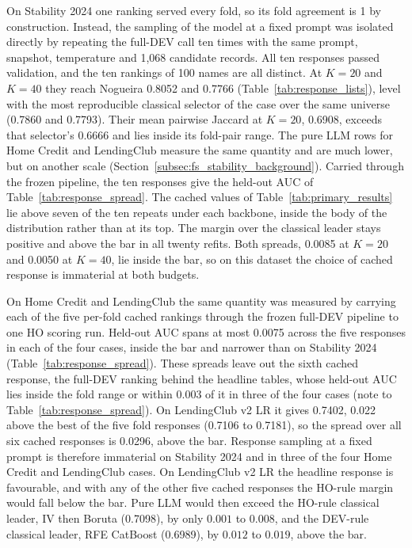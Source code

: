 \documentclass[final,5p,twocolumn]{elsarticle}
\newcommand{\Kfeat}{K}
\begin{document}
On Stability 2024 one ranking served every fold, so its fold agreement is 1 by construction. Instead, the sampling of the model at a fixed prompt was isolated directly by repeating the full-DEV call ten times with the same prompt, snapshot, temperature and 1,068 candidate records. All ten responses passed validation, and the ten rankings of 100 names are all distinct. At $\Kfeat=20$ and $\Kfeat=40$ they reach Nogueira 0.8052 and 0.7766 (Table~\ref{tab:response_lists}), level with the most reproducible classical selector of the case over the same universe (0.7860 and 0.7793). Their mean pairwise Jaccard at $\Kfeat=20$, 0.6908, exceeds that selector's 0.6666 and lies inside its fold-pair range. The pure LLM rows for Home Credit and LendingClub measure the same quantity and are much lower, but on another scale (Section~\ref{subsec:fs_stability_background}). Carried through the frozen pipeline, the ten responses give the held-out AUC of Table~\ref{tab:response_spread}. The cached values of Table~\ref{tab:primary_results} lie above seven of the ten repeats under each backbone, inside the body of the distribution rather than at its top. The margin over the classical leader stays positive and above the bar in all twenty refits. Both spreads, 0.0085 at $\Kfeat=20$ and 0.0050 at $\Kfeat=40$, lie inside the bar, so on this dataset the choice of cached response is immaterial at both budgets.

On Home Credit and LendingClub the same quantity was measured by carrying each of the five per-fold cached rankings through the frozen full-DEV pipeline to one HO scoring run. Held-out AUC spans at most 0.0075 across the five responses in each of the four cases, inside the bar and narrower than on Stability 2024 (Table~\ref{tab:response_spread}). These spreads leave out the sixth cached response, the full-DEV ranking behind the headline tables, whose held-out AUC lies inside the fold range or within 0.003 of it in three of the four cases (note to Table~\ref{tab:response_spread}). On LendingClub v2 LR it gives 0.7402, 0.022 above the best of the five fold responses (0.7106 to 0.7181), so the spread over all six cached responses is 0.0296, above the bar. Response sampling at a fixed prompt is therefore immaterial on Stability 2024 and in three of the four Home Credit and LendingClub cases. On LendingClub v2 LR the headline response is favourable, and with any of the other five cached responses the HO-rule margin would fall below the bar. Pure LLM would then exceed the HO-rule classical leader, IV then Boruta (0.7098), by only $0.001$ to $0.008$, and the DEV-rule classical leader, RFE CatBoost (0.6989), by $0.012$ to $0.019$, above the bar.
\end{document}
